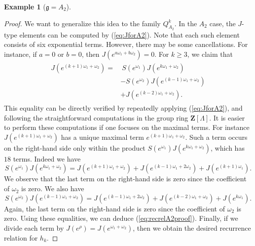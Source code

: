 \documentclass{amsart}
\newcommand{\mf}{\mathfrak}
\newcommand{\Z}{\mathbf Z}
\numberwithin{equation}{section}
\theoremstyle{plain}
\theoremstyle{definition}
\newtheorem{example}[theorem]{Example}
\begin{document}
\begin{example}[$\mf{g}=A_2$]
\begin{proof}
We want to generalize this idea to the family $Q_{A_2}^k$. In the $A_2$ case, the $J$-type elements can be computed by (\ref{eq:JforA2}). Note that each such element consists of six exponential terms. However, there may be some cancellations. For instance, if $a=0$ or $b=0$, then $J(e^{a\omega_1+b\omega_2})=0$. For $k\ge 3$, we claim that 
\begin{align}\label{eq:recrelA2proof}
\begin{split}
J(e^{(k+1)\omega_1+\omega_2}) = 
&\ S(e^{\omega_1})J(e^{k\omega_1+\omega_2}) \\
&-S(e^{\omega_2})J(e^{(k-1)\omega_1+\omega_2})\\
&+J(e^{(k-2)\omega_1+\omega_2}).	
\end{split}
\end{align}
This equality can be directly verified by repeatedly applying (\ref{eq:JforA2}), and following the straightforward computations in the group ring $\Z[\Lambda]$. It is easier to perform these computations if one focuses on the maximal terms. For instance $J(e^{(k+1)\omega_1+\omega_2})$ has a unique maximal term $e^{(k+1)\omega_1+\omega_2}$. Such a term occurs on the right-hand side only within the product $S(e^{\omega_1})J(e^{k\omega_1+\omega_2})$, which has $18$ terms. Indeed we have
$$S(e^{\omega_1})J(e^{k\omega_1+\omega_2}) = J(e^{(k+1)\omega_1+\omega_2}) + J(e^{(k-1)\omega_1+2\omega_2}) + J(e^{(k+1)\omega_1}).$$
We observe that the last term on the right-hand side is zero since the coefficient of $\omega_2$ is zero. We also have
$$S(e^{\omega_2})J(e^{(k-1)\omega_1+\omega_2}) = J(e^{(k-1)\omega_1+2\omega_2}) +  J(e^{(k-2)\omega_1+\omega_2})+J(e^{k\omega_1}).$$
Again, the last term on the right-hand side is zero since the coefficient of $\omega_2$ is zero. Using these equalities, we can deduce (\ref{eq:recrelA2proof}). Finally, if we divide each term by $J(e^\rho)=J(e^{\omega_1+\omega_2})$, then we obtain the desired recurrence relation for $h_k$. 
\end{proof}
\end{example}
\end{document}
